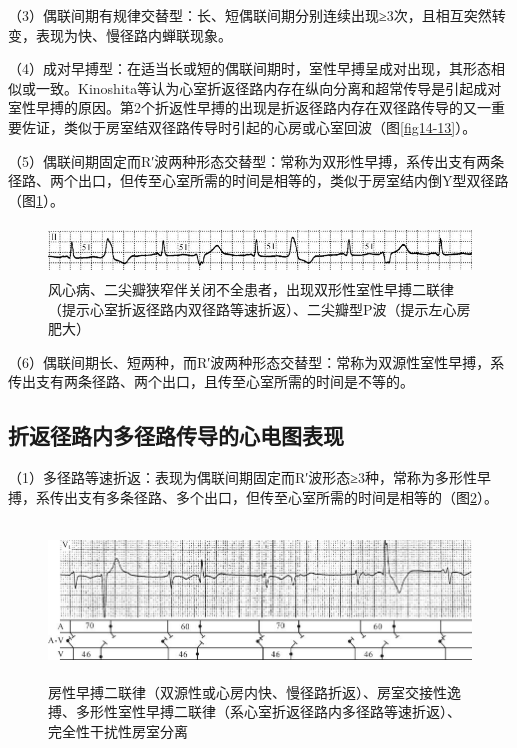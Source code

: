 （3）偶联间期有规律交替型：长、短偶联间期分别连续出现≥3次，且相互突然转变，表现为快、慢径路内蝉联现象。

（4）成对早搏型：在适当长或短的偶联间期时，室性早搏呈成对出现，其形态相似或一致。Kinoshita等认为心室折返径路内存在纵向分离和超常传导是引起成对室性早搏的原因。第2个折返性早搏的出现是折返径路内存在双径路传导的又一重要佐证，类似于房室结双径路传导时引起的心房或心室回波（图\ref{fig14-13}）。

（5）偶联间期固定而R′波两种形态交替型：常称为双形性早搏，系传出支有两条径路、两个出口，但传至心室所需的时间是相等的，类似于房室结内倒Y型双径路（图\ref{fig25-22}）。

\begin{figure}[!htbp]
 \centering
 \includegraphics[width=5.58333in,height=0.53125in]{./images/Image00440.jpg}
 \captionsetup{justification=centering}
 \caption{风心病、二尖瓣狭窄伴关闭不全患者，出现双形性室性早搏二联律（提示心室折返径路内双径路等速折返）、二尖瓣型P波（提示左心房肥大）}
 \label{fig25-22}
  \end{figure} 

（6）偶联间期长、短两种，而R′波两种形态交替型：常称为双源性室性早搏，系传出支有两条径路、两个出口，且传至心室所需的时间是不等的。

\protect\hypertarget{text00032.htmlux5cux23subid392}{}{}

\subsection{折返径路内多径路传导的心电图表现}

（1）多径路等速折返：表现为偶联间期固定而R′波形态≥3种，常称为多形性早搏，系传出支有多条径路、多个出口，但传至心室所需的时间是相等的（图\ref{fig25-23}）。

\begin{figure}[!htbp]
 \centering
 \includegraphics[width=5.76042in,height=1.63542in]{./images/Image00441.jpg}
 \captionsetup{justification=centering}
 \caption{房性早搏二联律（双源性或心房内快、慢径路折返）、房室交接性逸搏、多形性室性早搏二联律（系心室折返径路内多径路等速折返）、完全性干扰性房室分离}
 \label{fig25-23}
  \end{figure} 

